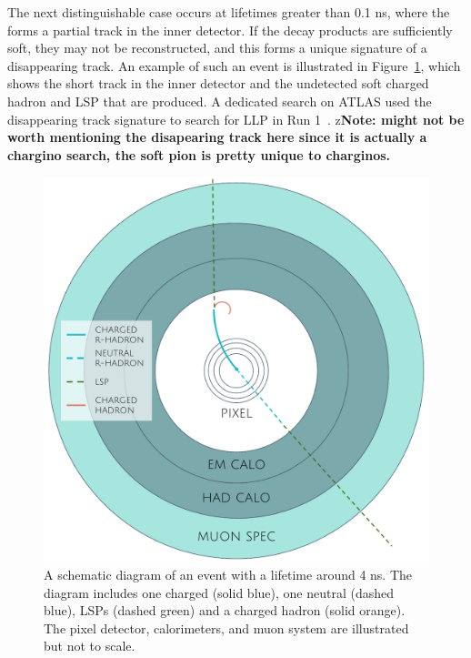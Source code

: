 The next distinguishable case occurs at lifetimes greater than 0.1 ns, where the \rhadron forms a partial track in the inner detector.
If the decay products are sufficiently soft, they may not be reconstructed, and this forms a unique signature of a disappearing track.
An example of such an event is illustrated in Figure~\ref{fig:rhadron_disappear}, which shows the short track in the inner detector and the undetected soft charged hadron and \ac{LSP} that are produced.
A dedicated search on ATLAS used the disappearing track signature to search for \ac{LLP} in Run 1~\cite{SUSY-2013-01}.
z\textbf{Note: might not be worth mentioning the disapearing track here since it is actually a chargino search, the soft pion is pretty unique to charginos.}

\begin{figure}[h!]
\centering
\includegraphics[width=\halffig]{figures/rhadron_disappear.pdf}
\caption{A schematic diagram of an \rhadron event with a lifetime around 4 ns. The diagram includes one charged \rhadron (solid blue), one neutral \rhadron (dashed blue), \acp{LSP} (dashed green) and a charged hadron (solid orange). The pixel detector, calorimeters, and muon system are illustrated but not to scale.}
\label{fig:rhadron_disappear}
\end{figure}

